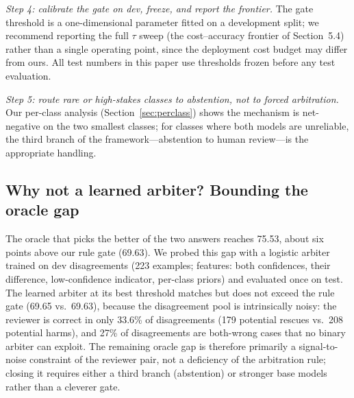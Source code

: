 \documentclass[final,5p,times,twocolumn]{elsarticle}
\begin{document}
\emph{Step 4: calibrate the gate on dev, freeze, and report the frontier.}
The gate threshold is a one-dimensional parameter fitted on a development
split; we recommend reporting the full $\tau$ sweep (the cost--accuracy
frontier of Section~5.4) rather than a single operating point, since the
deployment cost budget may differ from ours. All test numbers in this paper
use thresholds frozen before any test evaluation.

\emph{Step 5: route rare or high-stakes classes to abstention, not to
forced arbitration.} Our per-class analysis (Section~\ref{sec:perclass}) shows the
mechanism is net-negative on the two smallest classes; for classes where
both models are unreliable, the third branch of the
framework---abstention to human review---is the appropriate handling.

\subsection{Why not a learned arbiter? Bounding the oracle gap}
The oracle that picks the better of the two answers reaches 75.53, about six
points above our rule gate (69.63). We probed this gap with a logistic
arbiter trained on dev disagreements (223 examples; features: both
confidences, their difference, low-confidence indicator, per-class priors)
and evaluated once on test. The learned arbiter at its best threshold
matches but does not exceed the rule gate (69.65 vs.\ 69.63), because the
disagreement pool is intrinsically noisy: the reviewer is correct in only
33.6\% of disagreements (179 potential rescues vs.\ 208 potential harms),
and 27\% of disagreements are both-wrong cases that no binary arbiter can
exploit. The remaining oracle gap is therefore primarily a signal-to-noise
constraint of the reviewer pair, not a deficiency of the arbitration rule;
closing it requires either a third branch (abstention) or stronger base
models rather than a cleverer gate.
\end{document}
